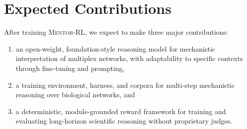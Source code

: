 \documentclass[letterpaper,11pt]{article}
\begin{document}
\section{Expected Contributions}
After training \textsc{Mentor-RL}, we expect to make three major contributions:
\begin{enumerate}
    \item an open-weight, foundation-style reasoning model for mechanistic interpretation of multiplex networks, with adaptability to specific contexts through fine-tuning and prompting,
    \item a training environment, harness, and corpora for multi-step mechanistic reasoning over biological networks, and
    \item a deterministic, module-grounded reward framework for training and evaluating long-horizon scientific reasoning without proprietary judges. 
\end{enumerate}
\end{document}
